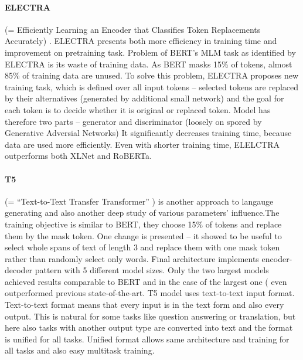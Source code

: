 \paragraph{ELECTRA} (= Efficiently Learning an Encoder that Classifies Token Replacements Accurately) \citep{Clark2020}. ELECTRA presents both more efficiency in training time and improvement on pretraining task. Problem of BERT's MLM task as identified by ELECTRA is its waste of training data. As BERT masks 15\% of tokens, almost 85\% of training data are unused. To solve this problem, ELECTRA proposes new training task, which is defined over all input tokens -- selected tokens are replaced by their alternatives (generated by additional small network) and the goal for each token is to decide whether it is original or replaced token. Model has therefore two parts -- generator and discriminator (loosely on spored by Generative Adversial Networks) It significantly decreases training time, because data are used more efficiently. Even with shorter training time, ELELCTRA outperforms both XLNet and RoBERTa.
\paragraph{T5} (= “Text-to-Text Transfer Transformer” ) \citep{Raffel2019a} is another approach to langauge generating and also another deep study of various parameters' influence.The training objective is similar to BERT, they choose 15\% of tokens and replace them by the mask token. One change is presented -- it showed to be useful to select whole spans of text of length 3 and replace them with one mask token rather than randomly select only words. Final architecture implements encoder-decoder pattern with 5 different model sizes. Only the two largest models achieved results comparable to BERT and in the case of the largest one (%
even outperformed previous state-of-the-art. T5 model uses text-to-text input format. Text-to-text format means that every input is in the text form and also every output. This is natural for some tasks like question answering or translation, but here also tasks with another output type are converted into text and the format is unified for all tasks. Unified format allows same architecture and training for all tasks and also easy multitask training.   %
